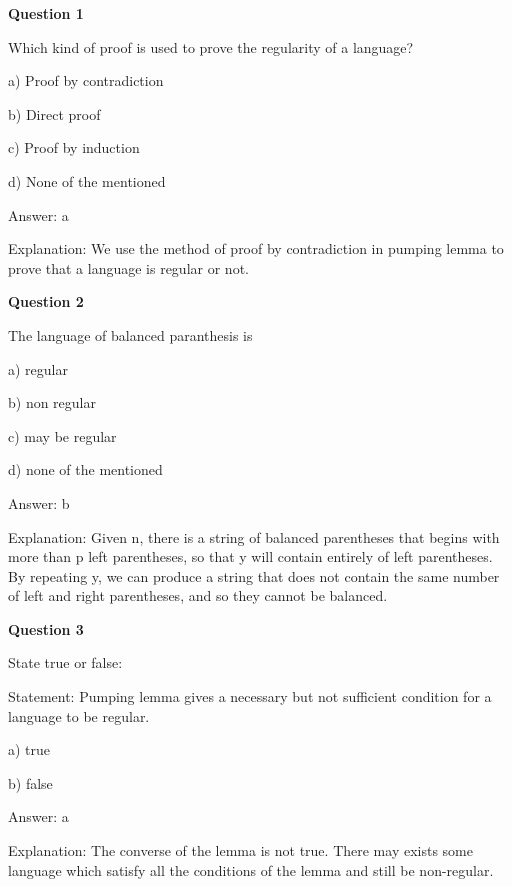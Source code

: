 \documentclass{article}
\begin{document}
\begin{mdframed}[linewidth=1pt, roundcorner=5pt, linecolor=gray!30, backgroundcolor=gray!5]
\textbf{Question 1} 

Which kind of proof is used to prove the regularity of a language?

a) Proof by contradiction

b) Direct proof

c) Proof by induction

d) None of the mentioned
\vspace{5pt} \par
\begin{tcolorbox}[colback=green!5, colframe=green!40!black, title=Solution]
Answer: a

Explanation: We use the method of proof by contradiction in pumping lemma to prove that a language is regular or not.
\end{tcolorbox}
\end{mdframed}

\begin{mdframed}[linewidth=1pt, roundcorner=5pt, linecolor=gray!30, backgroundcolor=gray!5]
\textbf{Question 2} 

The language of balanced paranthesis is

a) regular

b) non regular

c) may be regular

d) none of the mentioned
\vspace{5pt} \par
\begin{tcolorbox}[colback=green!5, colframe=green!40!black, title=Solution]
Answer: b

Explanation: Given n, there is a string of balanced parentheses that begins with more than p left parentheses, so that y will contain entirely of left parentheses. By repeating y, we can produce a string that does not contain the same number of left and right parentheses, and so they cannot be balanced.
\end{tcolorbox}
\end{mdframed}

\begin{mdframed}[linewidth=1pt, roundcorner=5pt, linecolor=gray!30, backgroundcolor=gray!5]
\textbf{Question 3} 

State true or false:

Statement: Pumping lemma gives a necessary but not sufficient condition for a language to be regular.

a) true

b) false
\vspace{5pt} \par
\begin{tcolorbox}[colback=green!5, colframe=green!40!black, title=Solution]
Answer: a

Explanation: The converse of the lemma is not true. There may exists some language which satisfy all the conditions of the lemma and still be non-regular.
\end{tcolorbox}
\end{mdframed}
\newpage
\end{document}
